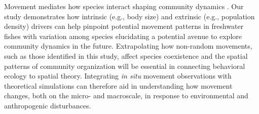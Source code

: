 \documentclass[11pt, class=article, crop=false]{standalone}
\begin{document}
Movement mediates how species interact shaping community dynamics \citep{schlagelMovementmediatedCommunityAssembly2020}. Our study demonstrates how intrinsic (e.g., body size) and extrinsic (e.g., population density) drivers can help pinpoint potential movement patterns in freshwater fishes with variation among species elucidating a potential avenue to explore community dynamics in the future. Extrapolating how non-random movements, such as those identified in this study, affect species coexistence and the spatial patterns of community organization will be essential in connecting behavioral ecology to spatial theory. Integrating \textit{in situ} movement observations with theoretical simulations can therefore aid in understanding how movement changes, both on the micro- and macroscale, in response to environmental and anthropogenic disturbances. 








\end{document}
